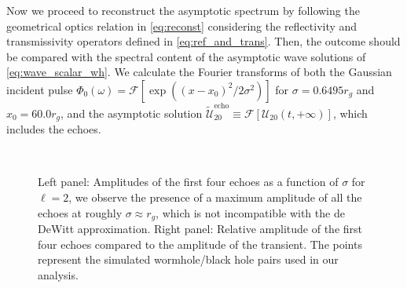 \documentclass[article,aps,nofootinbib,twocolumn,superscriptaddress]{revtex4-1}
\begin{document}
Now we proceed to reconstruct the asymptotic spectrum by following the geometrical optics relation in \eqref{eq:reconst} considering the reflectivity and transmissivity operators defined in \eqref{eq:ref_and_trans}. Then, the outcome should be compared with the spectral content of the asymptotic wave solutions of \eqref{eq:wave_scalar_wh}. We calculate the Fourier transforms of both the Gaussian incident pulse $\Phi_0(\omega)=\mathcal{F}[\exp\left((x-x_0)^2/2\sigma^2\right)]$ for $\sigma=0.6495r_g$ and $x_0=60.0r_g$, and the asymptotic solution $\tilde{\mathcal{U}}_{20}^{\mathrm{echo}}\equiv\mathcal{F}[\mathcal{U}_{20}(t,+\infty)]$, which includes the echoes.\\

\begin{figure}
\centering
{} \,
\caption{\label{fig:echo_sigma} Left panel: Amplitudes of the first four echoes as a function of $\sigma$ for $\ell=2$, we observe the presence of a maximum amplitude of all the echoes at roughly $\sigma\approx r_g$, which is not incompatible with the de DeWitt approximation. Right panel: Relative amplitude of the first four echoes compared to the amplitude of the transient. The points represent the simulated wormhole/black hole pairs used in our analysis.} 
\end{figure}
\end{document}
